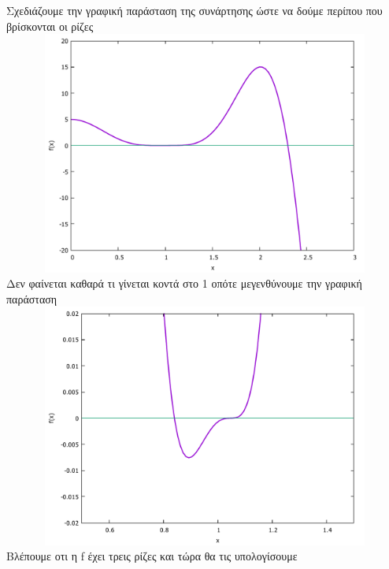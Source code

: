 \documentclass[a4paper,11pt]{article}
\newcommand{\lt}{\latintext}
\newcommand{\gt}{\greektext}
\begin{document}
	\normalsize{Σχεδιάζουμε την γραφική παράσταση της συνάρτησης 
	ώστε να δούμε περίπου που βρίσκονται οι ρίζες}
	\\
	\hspace*{-1 cm}
	\includegraphics[height=8cm, width=15cm]{Ask2.pdf}
	\normalsize{Δεν φαίνεται καθαρά τι γίνεται κοντά στο 1 οπότε
 μεγενθύνουμε την γραφική παράσταση}	
	\\
	\hspace*{-2 cm}
	\includegraphics[height=8cm, width=16cm]{detail.pdf}
	\normalsize{Βλέπουμε οτι η \lt f \gt έχει τρεις ρίζες και 
	τώρα θα τις υπολογίσουμε}
	
\end{document}
